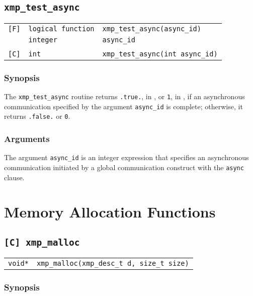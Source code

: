 \subsection{\tt xmp\_test\_async}

\begin{tabular}{lll}

\verb![F]!& {\tt logical function} & {\tt xmp\_test\_async(async\_id)}\\
          & {\tt integer} & {\tt async\_id}\\
          & & \\
\verb![C]!&  {\tt int} & {\tt  xmp\_test\_async(int async\_id)}

\end{tabular}

\subsubsection*{Synopsis}

The {\tt xmp\_test\_async} routine returns {\tt .true.}, in {\XMPF}, or
{\tt 1}, in {\XMPC}, if an asynchronous communication specified by the
argument {\tt async\_id} is complete; otherwise, it returns {\tt .false.}
or {\tt 0}.

\subsubsection*{Arguments}

The argument {\tt async\_id} is an integer expression that specifies an
asynchronous communication initiated by a global communication construct
with the {\tt async} clause.


\section{Memory Allocation Functions}

\subsection{\tt [C] xmp\_malloc}
\label{subsec: xmp_malloc}

\begin{tabular}{ll}

{\tt void*} & {\tt xmp\_malloc(xmp\_desc\_t d, size\_t size)}

\end{tabular}

\subsubsection*{Synopsis}

